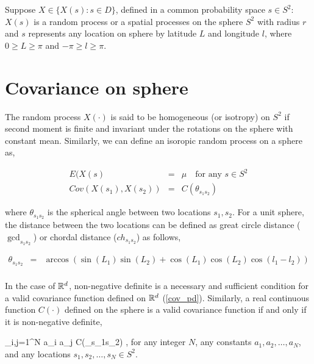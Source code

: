 

Suppose $X \in \{X(s): s\in D\}$, defined in a common probability space $s \in S^2$: $X(s)$ is a random process or a spatial processes on the sphere $S^2$ with radius $r$ and $s$ represents any location on sphere by latitude $L$ and longitude $l$, where $0 \ge L \ge \pi$ and $-\pi \ge l \ge \pi$.\\


\section{Covariance on sphere} 

The random process $X(\cdot)$ is said to be homogeneous (or isotropy) on $S^2$ if second moment is finite and invariant under the rotations on the sphere with constant mean. Similarly, we can define an isoropic random process on a sphere as, 

\begin{eqnarray*}
	E(X(s) &=& \mu \quad \mbox{for any } s\in S^2 \\
	Cov(X(s_1),X(s_2)) &=& C(\theta_{s_1s_2}) 
\end{eqnarray*}

where $\theta_{s_1s_2}$ is the spherical angle between two locations $s_1,s_2$. For a unit sphere, the distance between the two locations can be defined as great circle distance ($\gcd_{s_1s_2}$) or chordal distance ($ch_{s_1s_2}$) as follows,

\begin{eqnarray*}
	\theta_{s_1s_2}  &=& \arccos\left(\sin(L_1)\sin(L_2) + \cos(L_1)\cos(L_2)\cos(l_1-l_2)\right)\\
\end{eqnarray*}

In the case of $\mathbb{R}^d$, non-negative definite is a necessary and sufficient condition for a valid covariance function defined on $\mathbb{R}^d$ (\ref{cov_pd}). Similarly, a real continuous function $C(\cdot)$ defined on the sphere is a valid covariance function if and only if it is non-negative definite,

\beq
\sum_{i,j=1}^{N} a_i a_j C(\theta_{s_1s_2}) ,
\eeq
for any integer $N$, any constants $a_1, a_2, \ldots, a_N$, and any locations $s_1, s_2, \ldots, s_N \in S^2$.

